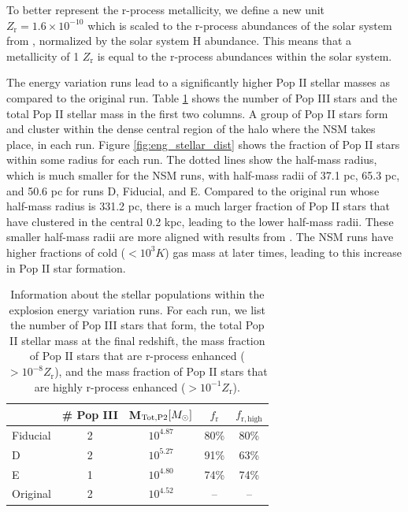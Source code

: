 \documentclass[fleqn,usenatbib]{mnras}
\begin{document}
To better represent the r-process metallicity, we define a new unit $Z_{\mathrm{r}} = 1.6 \times 10^{-10}$ which is scaled to the r-process abundances of the solar system from \citet{Goriely99}, normalized by the solar system H abundance. This means that a metallicity of 1 $Z_{\mathrm{r}}$ is equal to the r-process abundances within the solar system.

The energy variation runs lead to a significantly higher Pop II stellar masses as compared to the original run. Table \ref{tab:eng_stellar} shows the number of Pop III stars and the total Pop II stellar mass in the first two columns. A group of Pop II stars form and cluster within the dense central region of the halo where the NSM takes place, in each run. Figure \ref{fig:eng_stellar_dist} shows the fraction of Pop II stars within some radius for each run. The dotted lines show the half-mass radius, which is much smaller for the NSM runs, with half-mass radii of 37.1 pc, 65.3 pc, and 50.6 pc for runs D, Fiducial, and E. Compared to the original run whose half-mass radius is 331.2 pc, there is a much larger fraction of Pop II stars that have clustered in the central 0.2 kpc, leading to the lower half-mass radii. These smaller half-mass radii are more aligned with results from \citet{Ricotti16}. The NSM runs have higher fractions of cold ($< 10^{3} K$) gas mass at later times, leading to this increase in Pop II star formation.

\begin{table}
	\centering
	\begin{tabular}{lcccc} 
		\hline
		 & \# Pop III & M$_{\mathrm{Tot, P2}} [\Ms]$ & $f_{\mathrm{r}}$ & $f_{\mathrm{r, high}}$ \\
		\hline
		Fiducial & 2 & $10^{4.87}$ & 80\% & 80\% \\
		D & 2 & $10^{5.27}$ & 91\% & 63\% \\
		E & 1 & $10^{4.80}$ & 74\% & 74\% \\
		Original & 2 & $10^{4.52}$ & -- & -- \\
		\hline
	\end{tabular}
	\caption[Information about the stellar populations within the explosion energy variation runs.]{Information about the stellar populations within the explosion energy variation runs. For each run, we list the number of Pop III stars that form, the total Pop II stellar mass at the final redshift, the mass fraction of Pop II stars that are r-process enhanced ($> 10^{-8} Z_{\mathrm{r}}$), and the mass fraction of Pop II stars that are highly r-process enhanced ($> 10^{-1} Z_{\mathrm{r}}$).}
	\label{tab:eng_stellar}
\end{table}
\end{document}
